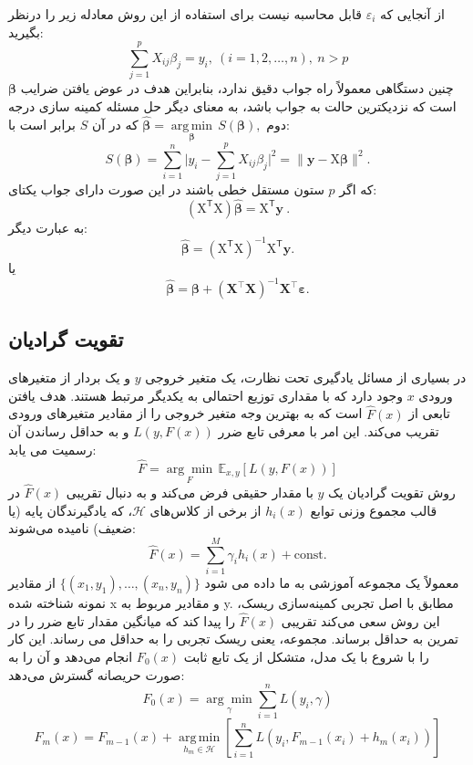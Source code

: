 \documentclass[12pt,a4paper,BCOR=.7cm,headsepline,bibliography=totoc]{report}
\begin{document}
از آنجایی که $\varepsilon _{i}$ قابل محاسبه نیست برای استفاده از این روش معادله زیر را درنظر بگیرید:
$$
{\displaystyle \sum _{j=1}^{p}X_{ij}\beta _{j}=y_{i},\ (i=1,2,\dots ,n),\ n>p}
$$
چنین دستگاهی معمولاً راه جواب دقیق ندارد، بنابراین هدف در عوض یافتن ضرایب ${\displaystyle {\boldsymbol {\beta }}}$ است که نزدیکترین حالت به جواب باشد، به معنای دیگر حل مسئله کمینه سازی درجه دوم ${\hat {\boldsymbol {\beta }}}={\underset {\boldsymbol {\beta }}{\operatorname {arg\,min} }}\,S({\boldsymbol {\beta }}),$
که در آن $S$ برابر است با:
$$
{\displaystyle S({\boldsymbol {\beta }})=\sum _{i=1}^{n}{\biggl |}y_{i}-\sum _{j=1}^{p}X_{ij}\beta _{j}{\biggr |}^{2}={\bigl \|}\mathbf {y} -\mathrm {X} {\boldsymbol {\beta }}{\bigr \|}^{2}.}
$$
که اگر $p$ ستون مستقل خطی باشند در این صورت دارای جواب یکتای:
$$
{\displaystyle (\mathrm {X} ^{\mathsf {T}}\mathrm {X} ){\hat {\boldsymbol {\beta }}}=\mathrm {X} ^{\mathsf {T}}\mathbf {y} \ .}
$$
به عبارت دیگر:
$$
{\displaystyle {\hat {\boldsymbol {\beta }}}=\left(\mathrm {X} ^{\mathsf {T}}\mathrm {X} \right)^{-1}\mathrm {X} ^{\mathsf {T}}\mathbf {y} .}
$$
یا
$$
{\displaystyle {\hat {\boldsymbol {\beta }}}={\boldsymbol {\beta }}+(\mathbf {X} ^{\top }\mathbf {X} )^{-1}\mathbf {X} ^{\top }{\boldsymbol {\varepsilon }}.}
$$

\subsection{تقویت گرادیان}
در بسیاری از مسائل یادگیری تحت نظارت، یک متغیر خروجی $y$ و یک بردار از متغیرهای ورودی $x$ وجود دارد که با مقداری توزیع احتمالی به یکدیگر مرتبط هستند. هدف یافتن تابعی از ${\displaystyle {\hat {F}}(x)}$ است که به بهترین وجه متغیر خروجی را از مقادیر متغیرهای ورودی تقریب می‌کند. این امر با معرفی تابع ضرر ${\displaystyle L(y,F(x))}$ و به حداقل رساندن آن رسمیت می یابد:
$${\displaystyle {\hat {F}}={\underset {F}{\arg \min }}\,\mathbb {E} _{x,y}[L(y,F(x))]}$$
روش تقویت گرادیان\cite{Stochastic Gradient Boosting} یک $y$ با مقدار حقیقی فرض می‌کند و به دنبال تقریبی ${\displaystyle {\hat {F}}(x)}$ در قالب مجموع وزنی توابع ${\displaystyle h_{i}(x)}$ از برخی از کلاس‌های ${\displaystyle {\mathcal {H}}}$، که یادگیرندگان پایه (یا ضعیف) نامیده می‌شوند:
$${\displaystyle {\hat {F}}(x)=\sum _{i=1}^{M}\gamma _{i}h_{i}(x)+{\mbox{const}}}.$$
معمولاً یک مجموعه آموزشی به ما داده می شود ${\displaystyle \{(x_{1},y_{1}),\dots ,(x_{n},y_{n})\}}$ از مقادیر نمونه شناخته شده x و مقادیر مربوط به y. مطابق با اصل تجربی کمینه‌سازی ریسک، این روش سعی می‌کند تقریبی ${\displaystyle {\hat {F}}(x)}$ را پیدا کند که میانگین مقدار تابع ضرر را در تمرین به حداقل برساند. مجموعه، یعنی ریسک تجربی را به حداقل می رساند. این کار را با شروع با یک مدل، متشکل از یک تابع ثابت ${\displaystyle F_{0}(x)}$ انجام می‌دهد و آن را به صورت حریصانه گسترش می‌دهد:
$${\displaystyle F_{0}(x)={\underset {\gamma }{\arg \min }}{\sum _{i=1}^{n}{L(y_{i},\gamma )}}}$$
$${\displaystyle F_{m}(x)=F_{m-1}(x)+{\underset {h_{m}\in {\mathcal {H}}}{\operatorname {arg\,min} }} \left[{\sum _{i=1}^{n}{L(y_{i},F_{m-1}(x_{i})+h_{m}(x_{i}))}} \right]}$$
\end{document}
